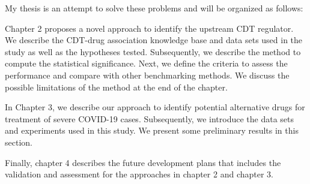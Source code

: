 My thesis is an attempt to solve these problems and will be organized as follows:

Chapter 2 proposes a novel approach to identify the upstream CDT regulator. 
We describe the CDT-drug association knowledge base and data sets used in the study as well as the hypotheses tested. Subsequently, we describe the method to compute the statistical significance. Next, we define the criteria to assess the performance and compare with other benchmarking methods. We discuss the possible limitations of the method at the end of the chapter.

In Chapter 3, we describe our approach to identify potential alternative drugs for treatment of severe  COVID-19 cases. Subsequently, we introduce the data sets and experiments used in this study. We present some preliminary results in this section.

Finally, chapter 4 describes the future development plans that includes the validation and assessment for the approaches in chapter 2 and chapter 3. 



